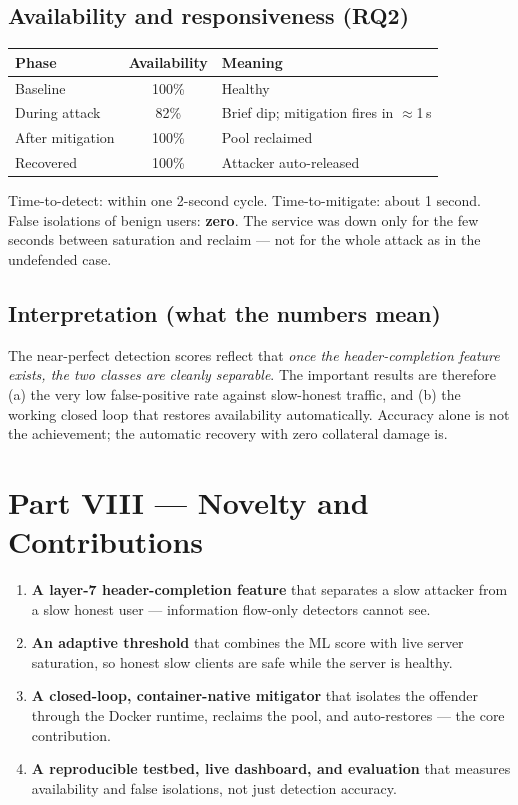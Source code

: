 \documentclass[11pt,a4paper]{article}
\begin{document}
\subsection{Availability and responsiveness (RQ2)}
\begin{center}
\begin{tabular}{lcl}
\toprule
Phase & Availability & Meaning \\
\midrule
Baseline & 100\% & Healthy \\
During attack & 82\% & Brief dip; mitigation fires in $\approx$1\,s \\
After mitigation & 100\% & Pool reclaimed \\
Recovered & 100\% & Attacker auto-released \\
\bottomrule
\end{tabular}
\end{center}
Time-to-detect: within one 2-second cycle. Time-to-mitigate: about 1 second.
False isolations of benign users: \textbf{zero}. The service was down only for the
few seconds between saturation and reclaim --- not for the whole attack as in the
undefended case.

\subsection{Interpretation (what the numbers mean)}
The near-perfect detection scores reflect that \emph{once the header-completion
feature exists, the two classes are cleanly separable}. The important results are
therefore (a) the very low false-positive rate against slow-honest traffic, and
(b) the working closed loop that restores availability automatically. Accuracy
alone is not the achievement; the automatic recovery with zero collateral damage
is.

\section{Part VIII --- Novelty and Contributions}
\begin{enumerate}
  \item \textbf{A layer-7 header-completion feature} that separates a slow attacker
  from a slow honest user --- information flow-only detectors cannot see.
  \item \textbf{An adaptive threshold} that combines the ML score with live server
  saturation, so honest slow clients are safe while the server is healthy.
  \item \textbf{A closed-loop, container-native mitigator} that isolates the
  offender through the Docker runtime, reclaims the pool, and auto-restores --- the
  core contribution.
  \item \textbf{A reproducible testbed, live dashboard, and evaluation} that
  measures availability and false isolations, not just detection accuracy.
\end{enumerate}
\end{document}

